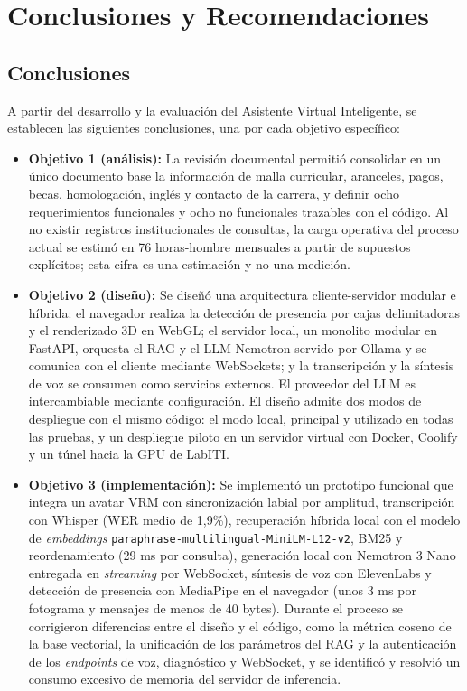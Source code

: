 \chapter{Conclusiones y Recomendaciones}

\section{Conclusiones}
A partir del desarrollo y la evaluación del Asistente Virtual Inteligente, se establecen las siguientes conclusiones, una por cada objetivo específico:

\begin{itemize}
    \item \textbf{Objetivo 1 (análisis):} La revisión documental permitió consolidar en un único documento base la información de malla curricular, aranceles, pagos, becas, homologación, inglés y contacto de la carrera, y definir ocho requerimientos funcionales y ocho no funcionales trazables con el código. Al no existir registros institucionales de consultas, la carga operativa del proceso actual se estimó en 76 horas-hombre mensuales a partir de supuestos explícitos; esta cifra es una estimación y no una medición.

    \item \textbf{Objetivo 2 (diseño):} Se diseñó una arquitectura cliente-servidor modular e híbrida: el navegador realiza la detección de presencia por cajas delimitadoras y el renderizado 3D en WebGL; el servidor local, un monolito modular en FastAPI, orquesta el RAG y el LLM Nemotron servido por Ollama y se comunica con el cliente mediante WebSockets; y la transcripción y la síntesis de voz se consumen como servicios externos. El proveedor del LLM es intercambiable mediante configuración. El diseño admite dos modos de despliegue con el mismo código: el modo local, principal y utilizado en todas las pruebas, y un despliegue piloto en un servidor virtual con Docker, Coolify y un túnel hacia la GPU de LabITI.

    \item \textbf{Objetivo 3 (implementación):} Se implementó un prototipo funcional que integra un avatar VRM con sincronización labial por amplitud, transcripción con Whisper (WER medio de 1,9\%), recuperación híbrida local con el modelo de \textit{embeddings} \texttt{paraphrase-\allowbreak{}multilingual-\allowbreak{}MiniLM-\allowbreak{}L12-\allowbreak{}v2}, BM25 y reordenamiento (29 ms por consulta), generación local con Nemotron 3 Nano entregada en \textit{streaming} por WebSocket, síntesis de voz con ElevenLabs y detección de presencia con MediaPipe en el navegador (unos 3 ms por fotograma y mensajes de menos de 40 bytes). Durante el proceso se corrigieron diferencias entre el diseño y el código, como la métrica coseno de la base vectorial, la unificación de los parámetros del RAG y la autenticación de los \textit{endpoints} de voz, diagnóstico y WebSocket, y se identificó y resolvió un consumo excesivo de memoria del servidor de inferencia.


\end{itemize}
